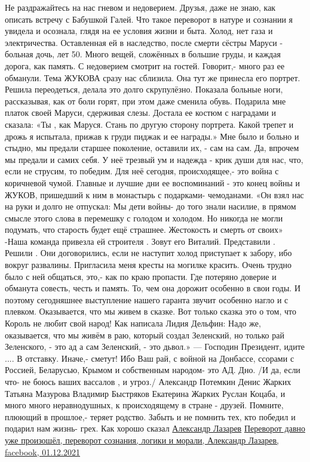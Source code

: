 \begin{multicols}{2}
\obeycr
Не раздражайтесь на нас гневом и недоверием.
Друзья, даже не знаю, как описать встречу с Бабушкой Галей.
Что такое переворот  в натуре и сознании я увидела и осознала, 
глядя на ее условия жизни и быта. Холод, нет газа и электричества. 
Оставленная ей в наследство, после смерти сёстры Маруси
 - больная дочь, лет 50.
Много вещей, сложённых в большие груды, 
и каждая дорога, как память.
С недоверием смотрит на гостей. Говорит,- много раз ее обманули. 
Тема ЖУКОВА  сразу нас сблизила. Она тут же принесла его портрет. Решила переодеться, делала это долго скрупулёзно.
Показала больные ноги,  рассказывая, как от боли горят,
при этом даже сменила обувь. 
Подарила мне платок своей  Маруси, сдерживая слезы. 
Достала ее костюм с наградами и сказала: 
«Ты , как Маруся. Стань по другую сторону портрета. 
 Какой трепет и дрожь я испытала, прижав к груди  пиджак и 
ее награды.»
Мне было и больно и стыдно, мы предали старшее поколение, оставили их, - сам на сам.  Да, впрочем мы предали и самих себя. 
У неё трезвый ум и надежда - крик души  для нас, 
что, если не струсим, то победим. 
Для неё сегодня, происходящее,- это война с коричневой чумой.
Главные и лучшие дни  ее воспоминаний - 
это конец войны и ЖУКОВ, пришедший к ним в монастырь 
с подарками- чемоданами. 
«Он взял нас на руки и долго не отпускал:
Мы дети войны- до того знали насилие, 
в прямом смысле этого слова в перемешку с голодом и холодом. 
Но никогда не могли подумать, что старость будет ещё страшнее. Жестокость и смерть от своих» 
-Наша команда привезла  ей  строителя . Зовут его Виталий. Представили .  Решили .
Они договорились, если не наступит холод приступает к забору, 
ибо вокруг развалины.  Пригласила меня кресты на могилке красить.
Очень трудно было с ней общаться, это,- как по краю пропасти. 
Где потеряно доверие и обманута совесть, честь и память. 
То, чем она дорожит особенно в свои годы.
И поэтому сегодняшнее выступление нашего гаранта звучит особенно нагло и с плевком.  Оказывается, что мы живем в сказке. 
Вот только сказка это о том, что Король не любит свой народ!
Как написала Лидия Дельфин:
Надо же, оказывается, что мы живём в раю, который создал Зеленский, но только рай Зеленского, - это ад а сам Зеленский, - это дьвол.»
 —
Господин Президент, идите .... В отставку. Иначе,- сметут!
Ибо Ваш рай, с войной на Донбассе, ссорами с Россией, Беларусью, Крымом и собственным народом- это АД. Дно.
/И да, если что- не боюсь ваших вассалов , и угроз./
Александр Потемкин
Денис Жарких
Татьяна Мазурова
Владимир Быстряков
Екатерина Жарких
Руслан Коцаба, и много много  неравнодушных, к происходящему в стране - друзей. Помните, плюющий в прошлое,- теряет родство. 
Забыть и не помнить тех, кто победил и подарил нам жизнь- грех.
Как хорошо сказал \href{https://www.facebook.com/profile.php?id=100008532614385}{Александр Лазарев}
\href{https://www.facebook.com/100008532614385/posts/2735352603425800/}{%
Переворот давно уже произошёл, переворот сознания, логики и морали, Александр Лазарев, facebook, %
01.12.2021%
}
\restorecr
\end{multicols}
